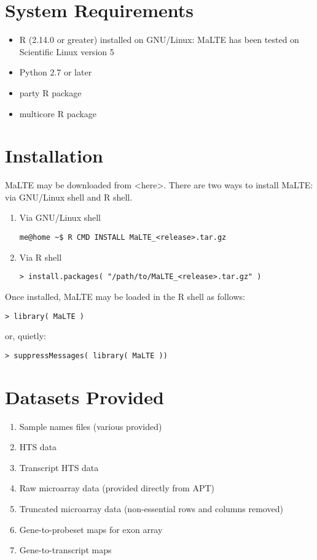 \documentclass[a4paper,12pt]{article}
\begin{document}
\section{System Requirements}
\begin{itemize}
\item R (2.14.0 or greater) installed on GNU/Linux: MaLTE has been tested on Scientific Linux version 5
\item Python 2.7 or later
\item party \textsf{R} package
\item multicore \textsf{R} package
\end{itemize}

\section{Installation}
MaLTE may be downloaded from \textless here\textgreater. There are two ways to install MaLTE: via GNU/Linux shell and R shell.

\begin{enumerate}
\item Via GNU/Linux shell
\begin{verbatim}
me@home ~$ R CMD INSTALL MaLTE_<release>.tar.gz
\end{verbatim}

\item Via R shell
\begin{verbatim}
> install.packages( "/path/to/MaLTE_<release>.tar.gz" )
\end{verbatim}
\end{enumerate}

Once installed, MaLTE may be loaded in the R shell as follows:
\begin{verbatim}
> library( MaLTE )
\end{verbatim}

or, quietly:

\begin{verbatim}
> suppressMessages( library( MaLTE ))
\end{verbatim}

\section{Datasets Provided}
\begin{enumerate}
\item Sample names files (various provided)
\item HTS data
\item Transcript HTS data
\item Raw microarray data (provided directly from APT)
\item Truncated microarray data (non-essential rows and columns removed)
\item Gene-to-probeset maps for exon array
\item Gene-to-transcript maps
\end{enumerate}
\end{document}
